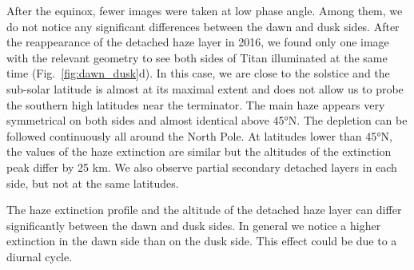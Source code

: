 After the equinox, fewer images were taken at low phase angle. Among them, we do not notice any
significant differences between the dawn and dusk sides. After the reappearance of the detached haze layer in
2016, we found only one image with the relevant geometry to see both sides of Titan illuminated at the same time
(Fig.~\ref{fig:dawn_dusk}d). In this case, we are close to the solstice and the sub-solar latitude is almost
at its maximal extent and does not allow us to probe the southern high latitudes near the terminator.
The main haze appears very symmetrical on both sides and almost identical
above \ang{45}N. The depletion can be followed continuously all around the North Pole. At latitudes lower than
\ang{45}N, the values of the haze extinction are similar but the altitudes of the extinction peak differ by
25 km. We also observe partial secondary detached layers in each side, but not at the same latitudes.

The haze extinction profile and the altitude of the detached haze layer can differ significantly between the dawn
and dusk sides. In general we notice a higher extinction in the dawn side than on the dusk side. This effect
could be due to a diurnal cycle.